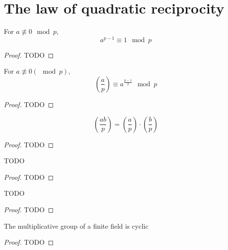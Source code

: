 \chapter{The law of quadratic reciprocity}


\begin{theorem}
  \label{fermats_little}
  \leanok
  For \(a \not\equiv 0 \mod p\),
  \[
  a^{p - 1} \equiv 1 \mod p
  \]
\end{theorem}
\begin{proof}
  TODO
\end{proof}


\begin{theorem}
  \label{euler_criterion}
  \leanok
  For \(a \not\equiv 0 (\mod p)\),
  \[
  (\frac{a}{p}) \equiv a ^{\frac{p-1}{2}} \mod p
  \]
\end{theorem}
\begin{proof}
  TODO
\end{proof}

\begin{theorem}
  \label{product_rule}
  \leanok
  \[
    (\frac{ab}{p}) =   (\frac{a}{p}) \cdot   (\frac{b}{p})
  \]
\end{theorem}
\begin{proof}
  TODO
\end{proof}

\begin{theorem}
  \label{gauss_lemma}
  \leanok
  TODO
\end{theorem}
\begin{proof}
  TODO
\end{proof}

\begin{theorem}
  \label{quadratic_reciprocity1}
  \leanok
  TODO
\end{theorem}
\begin{proof}
  TODO
\end{proof}


\begin{theorem}
  \label{mult_cyclic}
  \leanok
  The multiplicative group of a finite field is cyclic
\end{theorem}
\begin{proof}
  TODO
\end{proof}


